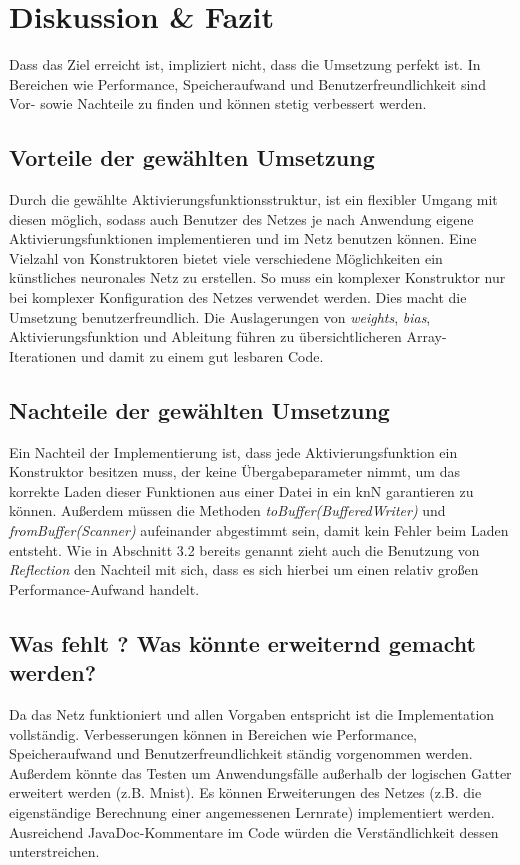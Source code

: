 \documentclass[paper=A4,pagesize=auto,12pt,headinclude=true,footinclude=true,BCOR=0mm,DIV=calc]{scrartcl}
\begin{document}
\newpage

\section{Diskussion \& Fazit}
Dass das Ziel erreicht ist, impliziert nicht, dass die Umsetzung perfekt ist. In Bereichen wie Performance, Speicheraufwand und Benutzerfreundlichkeit sind Vor- sowie Nachteile zu finden und können stetig verbessert werden.

\subsection{Vorteile der gewählten Umsetzung}
Durch die gewählte Aktivierungsfunktionsstruktur, ist ein flexibler Umgang mit diesen möglich, sodass auch Benutzer des Netzes je nach Anwendung eigene Aktivierungsfunktionen implementieren und im Netz benutzen können.
Eine Vielzahl von Konstruktoren bietet viele verschiedene Möglichkeiten ein künstliches neuronales Netz zu erstellen. So muss ein komplexer Konstruktor nur bei komplexer Konfiguration des Netzes verwendet werden.
Dies macht die Umsetzung benutzerfreundlich.
Die Auslagerungen von \textit{weights}, \textit{bias}, Aktivierungsfunktion und Ableitung führen zu übersichtlicheren Array-Iterationen und damit zu einem gut lesbaren Code.

\subsection{Nachteile der gewählten Umsetzung}
Ein Nachteil der Implementierung ist, dass jede Aktivierungsfunktion ein Konstruktor besitzen muss, der keine Übergabeparameter nimmt, um das korrekte Laden dieser Funktionen aus einer Datei in ein knN garantieren zu können. Außerdem müssen die Methoden \textit{toBuffer(BufferedWriter)} und \textit{fromBuffer(Scanner)} aufeinander abgestimmt sein, damit kein Fehler beim Laden entsteht.
Wie in Abschnitt 3.2 bereits genannt zieht auch die Benutzung von \textit{Reflection} den Nachteil mit sich, dass es sich hierbei um einen relativ großen Performance-Aufwand handelt.

\subsection{Was fehlt ? Was könnte erweiternd gemacht werden?}
Da das Netz funktioniert und allen Vorgaben entspricht ist die Implementation vollständig. Verbesserungen können in Bereichen wie Performance, Speicheraufwand und Benutzerfreundlichkeit ständig vorgenommen werden. Außerdem könnte das Testen um Anwendungsfälle außerhalb der logischen Gatter erweitert werden (z.B. Mnist). Es können Erweiterungen des Netzes (z.B. die eigenständige Berechnung einer angemessenen Lernrate) implementiert werden.
Ausreichend JavaDoc-Kommentare im Code würden die Verständlichkeit dessen unterstreichen.
\newpage
\end{document}
